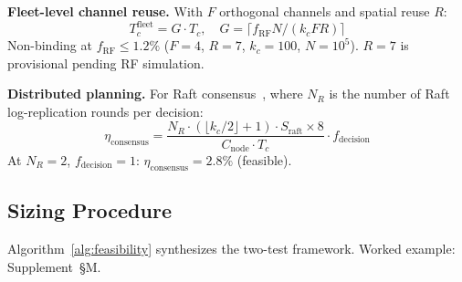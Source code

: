\documentclass[journal]{IEEEtran}
\begin{document}
\textbf{Fleet-level channel reuse.} With $F$ orthogonal channels and spatial reuse $R$:
\begin{equation}
    T_c^{\text{fleet}} = G \cdot T_c, \quad G = \lceil f_{\text{RF}} N / (k_c F R) \rceil
    \label{eq:fleet_reuse}
\end{equation}
Non-binding at $f_{\text{RF}} \leq 1.2\%$ ($F = 4$, $R = 7$, $k_c = 100$, $N = 10^5$). $R = 7$ is provisional pending RF simulation.

\textbf{Distributed planning.} For Raft consensus~\cite{ongaro_raft}, where $N_R$ is the number of Raft log-replication rounds per decision:
\begin{equation}
    \eta_{\text{consensus}} = \frac{N_R \cdot (\lfloor k_c/2 \rfloor + 1) \cdot S_{\text{raft}} \times 8}{C_{\text{node}} \cdot T_c} \cdot f_{\text{decision}}
    \label{eq:eta_consensus}
\end{equation}
At $N_R = 2$, $f_{\text{decision}} = 1$: $\eta_{\text{consensus}} = 2.8\%$ (feasible).

\subsection{Sizing Procedure}

Algorithm~\ref{alg:feasibility} synthesizes the two-test framework. Worked example: Supplement~\S M.
\end{document}
